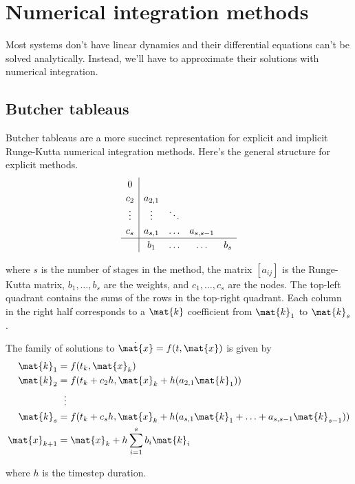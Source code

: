 \section{Numerical integration methods}

Most systems don't have linear dynamics and their differential equations can't
be solved analytically. Instead, we'll have to approximate their solutions with
numerical integration.

\subsection{Butcher tableaus}

Butcher tableaus are a more succinct representation for explicit and implicit
Runge-Kutta numerical integration methods. Here's the general structure for
explicit methods.
\begin{equation*}
  \renewcommand\arraystretch{1.2}
  \begin{array}{c|cccc}
    0 \\
    c_2    & a_{2,1} \\
    \vdots & \vdots & \ddots \\
    c_s    & a_{s,1} & \hdots & a_{s,s-1} \\
    \hline
           & b_1    & \hdots & \hdots    & b_s
  \end{array}
\end{equation*}

where $s$ is the number of stages in the method, the matrix $[a_{ij}]$ is the
Runge-Kutta matrix, $b_1, \ldots, b_s$ are the weights, and $c_1, \ldots, c_s$
are the nodes. The top-left quadrant contains the sums of the rows in the
top-right quadrant. Each column in the right half corresponds to a $\mat{k}$
coefficient from $\mat{k}_1$ to $\mat{k}_s$.

The family of solutions to $\dot{\mat{x}} = f(t, \mat{x})$ is given by
\begin{align*}
  \mat{k}_1 &= f(t_k, \mat{x}_k) \\
  \mat{k}_2 &= f(t_k + c_2 h, \mat{x}_k + h (a_{2,1} \mat{k}_1)) \\
  &\ \ \vdots \\
  \mat{k}_s &= f(t_k + c_s h, \mat{x}_k +
    h (a_{s,1} \mat{k}_1 + \ldots + a_{s,s-1} \mat{k}_{s-1})) \\
  \mat{x}_{k+1} &= \mat{x}_k + h \sum_{i=1}^s b_i \mat{k}_i
\end{align*}

where $h$ is the timestep duration.

